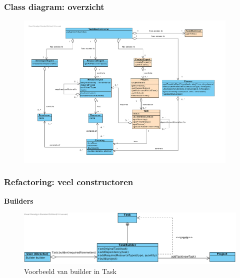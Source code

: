 \documentclass{beamer}
\begin{document}
\begin{frame}
\frametitle {Class diagram: overzicht}

\begin{figure}
\centering
\begin{center}
\includegraphics[width=0.95\textwidth]{figures/Class_diagram_iteratie2}
\end{center}
\vspace{1cm}

\end{figure}
\end{frame}

%
%   
%


\begin{frame}
\frametitle {Refactoring: veel constructoren}
\textbf{Builders}
\begin{figure}
\includegraphics[scale=0.5]{figures/builder}
\caption{Voorbeeld van builder in Task}
\end{figure}

\end{frame}
\end{document}
